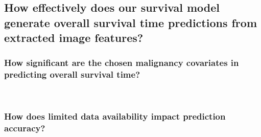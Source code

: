 \documentclass{l4proj}
\begin{document}
\subsection{How effectively does our survival model generate overall survival time predictions from extracted image features?}

\subsubsection{How significant are the chosen malignancy covariates in predicting overall survival time? }\hfill \\


\subsubsection{How does limited data availability impact prediction accuracy?}\hfill \\





\end{document}
